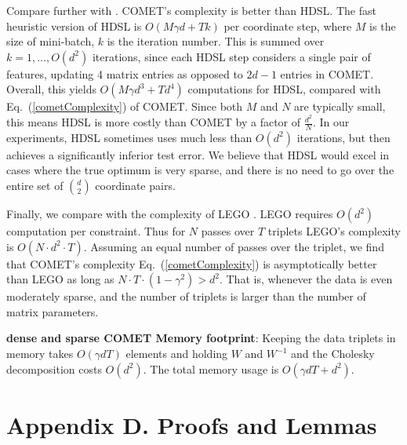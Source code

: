 \documentclass[twoside,11pt]{article}
\newcommand\mat[1]{{#1}}
\newcommand{\W}{\mat{W}}
\renewcommand{\eqref}[1]{Eq.~(\ref{#1})}
\begin{document}
Compare further with \citet{HDSL}. COMET’s complexity is better than HDSL. The fast heuristic version of HDSL is $O(M\gamma d+Tk)$ per coordinate step, where $M$ is the size of mini-batch, $k$ is the iteration number. This is summed over $k=1,...,O(d^2)$ iterations, since each HDSL step considers a single pair of features, updating 4 matrix entries as opposed to $2d-1$ entries in COMET. Overall, this yields $O(M\gamma d^3+Td^4)$ computations for HDSL, compared with \eqref{cometComplexity} of COMET. Since both $M$ and $N$ are typically small, this means HDSL is more costly than COMET by a factor of $\frac{d^2}{N}$. In our experiments, HDSL sometimes uses much less than $O(d^2)$ iterations, but then achieves a significantly inferior test error. We believe that HDSL would excel in cases where the true optimum is very sparse, and there is no need to go over the entire set of $d \choose 2$ coordinate pairs.

Finally, we compare with the complexity of LEGO \citep{lego}. LEGO requires $O(d^2)$ computation per constraint. Thus for $N$ passes over $T$ triplets LEGO's complexity is $O(N\cdot d^2 \cdot T)$. Assuming an equal number of passes over the triplet, we find that COMET's complexity \eqref{cometComplexity} is asymptotically better than LEGO as long as $N \cdot T \cdot (1-\gamma^2) > d^2$. That is, whenever the data is even moderately sparse, and the number of triplets is larger than the number of matrix parameters.

{\bf dense and sparse COMET Memory footprint}: Keeping the data triplets in memory takes $O(\gamma d T)$ elements and holding $\W$ and $\W^{-1}$ and the Cholesky decomposition costs $O(d^2)$. The total memory usage is $O(\gamma d T + d^2)$. 



\section*{Appendix D. Proofs and Lemmas}
\end{document}
